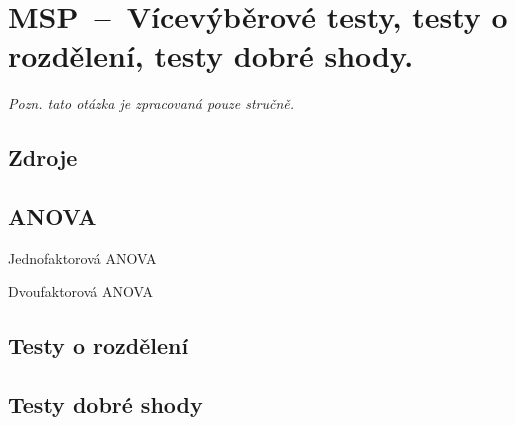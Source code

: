 

\graphicspath{{msp/testy/figures}}


\chapter{MSP~--~Vícevýběrové testy, testy o rozdělení, testy dobré shody.}


\textit{Pozn. tato otázka je zpracovaná pouze stručně.}

\section{Zdroje}

\begin{compactitem}
    \item {}
\end{compactitem}


\section{ANOVA}


Jednofaktorová ANOVA

Dvoufaktorová ANOVA


\section{Testy o rozdělení}



\section{Testy dobré shody}

